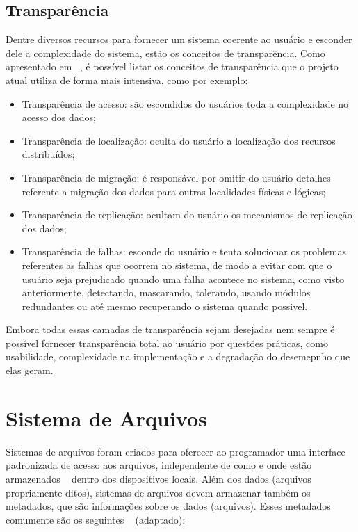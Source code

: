     
    \subsection{Transparência}
    
        Dentre diversos recursos para fornecer um sistema coerente ao usuário e esconder dele a complexidade do sistema, estão os conceitos de transparência. Como apresentado em ~\cite{tanenbaum}, é possível listar os conceitos de transparência que o projeto atual utiliza de forma mais intensiva, como por exemplo:
    
        \begin{itemize}
            \item Transparência de acesso: são escondidos do usuários toda a complexidade no acesso dos dados;
            
            \item Transparência de localização: oculta do usuário a localização dos recursos distribuídos;
            
            \item Transparência de migração: é responsável por omitir do usuário detalhes referente a migração dos dados para outras localidades físicas e lógicas;
            
            \item Transparência de replicação: ocultam do usuário os mecanismos de replicação dos dados;
            
            \item Transparência de falhas: esconde do usuário e tenta solucionar os problemas referentes as falhas que ocorrem no sistema, de modo a evitar com que o usuário seja prejudicado quando uma falha acontece no sistema, como visto anteriormente, detectando, mascarando, tolerando, usando módulos redundantes ou até mesmo recuperando o sistema quando possivel.
        \end{itemize}
    
        Embora todas essas camadas de transparência sejam desejadas nem sempre é possível fornecer transparência total ao usuário por questões práticas, como usabilidade, complexidade na implementação e a degradação do desemepnho que elas geram.


\section {Sistema de Arquivos}
    Sistemas de arquivos foram criados para oferecer ao programador uma interface padronizada de acesso aos arquivos, independente de como e onde estão armazenados ~\cite{coulouris} dentro dos dispositivos locais. 
    Além dos dados (arquivos propriamente ditos), sistemas de arquivos devem armazenar também os metadados, que são informações sobre os dados (arquivos). Esses metadados comumente são os seguintes ~\cite{coulouris} (adaptado):
    
